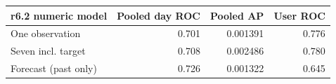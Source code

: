 \begin{tabular}{lrrr}
\toprule
r6.2 numeric model & Pooled day ROC & Pooled AP & User ROC \\
\midrule
One observation & 0.701 & 0.001391 & 0.776 \\
Seven incl. target & 0.708 & 0.002486 & 0.780 \\
Forecast (past only) & 0.726 & 0.001322 & 0.645 \\
\bottomrule
\end{tabular}
